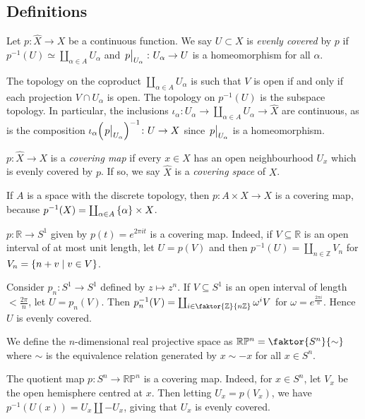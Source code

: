 \subsection{Definitions}
\begin{definition}
	Let \( p : \hat X \to X \) be a continuous function.
	We say \( U \subset X \) is \emph{evenly covered} by \( p \) if \( p^{-1}(U) \simeq \coprod_{\alpha \in A} U_\alpha \) and \( \eval{p}_{U_\alpha} \colon U_\alpha \to U \) is a homeomorphism for all \( \alpha \).
\end{definition}
The topology on the coproduct \( \coprod_{\alpha \in A} U_\alpha \) is such that \( V \) is open if and only if each projection \( V \cap U_\alpha \) is open.
The topology on \( p^{-1}(U) \) is the subspace topology.
In particular, the inclusions \( \iota_\alpha \colon U_\alpha \to \coprod_{\alpha \in A} U_\alpha \to \hat X \) are continuous, as is the composition \( \iota_\alpha \qty(\eval{p}_{U_\alpha})^{-1} \colon U \to X \) since \( \eval{p}_{U_\alpha} \) is a homeomorphism.
\begin{definition}
	\( p \colon \hat X \to X \) is a \emph{covering map} if every \( x \in X \) has an open neighbourhood \( U_x \) which is evenly covered by \( p \).
	If so, we say \( \hat X \) is a \emph{covering space} of \( X \).
\end{definition}
\begin{example}
	If \( A \) is a space with the discrete topology, then \( p \colon A \times X \to X \) is a covering map, because \( p^{-1}(X) = \coprod_{\alpha \in A} \qty{\alpha} \times X \).
\end{example}
\begin{example}
	\( p \colon \mathbb R \to S^1 \) given by \( p(t) = e^{2\pi i t} \) is a covering map.
	Indeed, if \( V \subseteq \mathbb R \) is an open interval of at most unit length, let \( U = p(V) \) and then \( p^{-1}(U) = \coprod_{n \in \mathbb Z} V_n \) for \( V_n = \qty{n + v \mid v \in V} \).
\end{example}
\begin{example}
	Consider \( p_n \colon S^1 \to S^1 \) defined by \( z \mapsto z^n \).
	If \( V \subseteq S^1 \) is an open interval of length \( <\frac{2\pi}{n} \), let \( U = p_n(V) \).
	Then \( p_n^{-1}(V) = \coprod_{i \in \faktor{\mathbb Z}{n\mathbb Z}} \omega^i V \) for \( \omega = e^{\frac{2\pi i}{n}} \).
	Hence \( U \) is evenly covered.
\end{example}
\begin{definition}
	We define the \( n \)-dimensional real projective space as \( \mathbb R\mathbb P^n = \faktor{S^n}{\sim} \) where \( \sim \) is the equivalence relation generated by \( x \sim -x \) for all \( x \in S^n \).
\end{definition}
\begin{example}
	The quotient map \( p \colon S^n \to \mathbb R\mathbb P^n \) is a covering map.
	Indeed, for \( x \in S^n \), let \( V_x \) be the open hemisphere centred at \( x \).
	Then letting \( U_x = p(V_x) \), we have \( p^{-1}(U(x)) = U_x \amalg -U_x \), giving that \( U_x \) is evenly covered.
\end{example}

